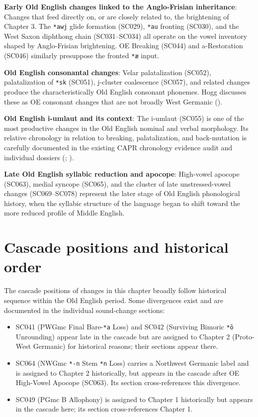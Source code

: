 \documentclass[
  british,
  a4paper,
  openany]{book}
\providecommand{\tightlist}{%
  \setlength{\itemsep}{0pt}\setlength{\parskip}{0pt}}
\begin{document}
\textbf{Early Old English changes linked to the Anglo-Frisian
inheritance}: Changes that feed directly on, or are closely related to,
the brightening of Chapter 3. The \texttt{*awj} glide formation (SC029),
\texttt{*au} fronting (SC030), and the West Saxon diphthong chain
(SC031--SC034) all operate on the vowel inventory shaped by
Anglo-Frisian brightening. OE Breaking (SC044) and a-Restoration (SC046)
similarly presuppose the fronted \texttt{*æ} input.

\textbf{Old English consonantal changes}: Velar palatalization (SC052),
palatalization of \texttt{*sk} (SC051), j-cluster coalescence (SC057),
and related changes produce the characteristically Old English consonant
phonemes. Hogg discusses these as OE consonant changes that are not
broadly West Germanic ().

\textbf{Old English i-umlaut and its context}: The i-umlaut (SC055) is
one of the most productive changes in the Old English nominal and verbal
morphology. Its relative chronology in relation to breaking,
palatalization, and back-mutation is carefully documented in the
existing CAPR chronology evidence audit and individual dossiers
(;
).

\textbf{Late Old English syllabic reduction and apocope}: High-vowel
apocope (SC063), medial syncope (SC065), and the cluster of late
unstressed-vowel changes (SC069--SC078) represent the later stage of Old
English phonological history, when the syllabic structure of the
language began to shift toward the more reduced profile of Middle
English.

\section{Cascade positions and historical
order}\label{cascade-positions-and-historical-order}

The cascade positions of changes in this chapter broadly follow
historical sequence within the Old English period. Some divergences
exist and are documented in the individual sound-change sections:

\begin{itemize}
\tightlist
\item
  SC041 (PWGmc Final Bare-\texttt{*a} Loss) and SC042 (Surviving Bimoric
  \texttt{*ō} Unrounding) appear late in the cascade but are assigned to
  Chapter 2 (Proto-West Germanic) for historical reasons; their sections
  appear there.
\item
  SC064 (NWGmc \texttt{*-n} Stem \texttt{*n} Loss) carries a Northwest
  Germanic label and is assigned to Chapter 2 historically, but appears
  in the cascade after OE High-Vowel Apocope (SC063). Its section
  cross-references this divergence.
\item
  SC049 (PGmc B Allophony) is assigned to Chapter 1 historically but
  appears in the cascade here; its section cross-references Chapter 1.
\end{itemize}
\end{document}
